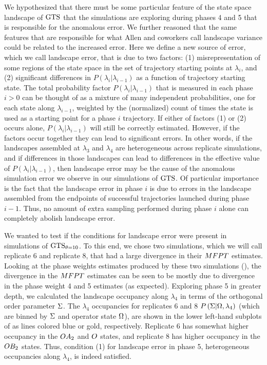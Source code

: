 We hypothesized that there must be some particular feature of the state space landscape of $\text{GTS}$ that the simulations are exploring during phases 4 and 5 that is responsible for the anomalous error. We further reasoned that the same features that are responsible for what Allen and coworkers call landscape variance\supercite{Allen:2006ch} could be related to the increased error. Here we define a new source of error, which we call landscape error, that is due to two factors: (1) misrepresentation of some regions of the state space in the set of trajectory starting points at $\lambda_i$, and (2) significant differences in $P\left(\lambda_{i}|\lambda_{i-1}\right)$ as a function of trajectory starting state. The total probability factor $P\left(\lambda_{i}|\lambda_{i-1}\right)$ that is measured in each phase $i>0$ can be thought of as a mixture of many independent probabilities, one for each state along $\lambda_{i-1}$, weighted by the (normalized) count of times the state is used as a starting point for a phase $i$ trajectory. If either of factors (1) or (2) occurs alone, $P\left(\lambda_{i}|\lambda_{i-1}\right)$ will still be correctly estimated. However, if the factors occur together they can lead to significant errors. In other words, if the landscapes assembled at $\lambda_3$ and $\lambda_4$ are heterogeneous across replicate simulations, and if differences in those landscapes can lead to differences in the effective value of $P\left(\lambda_{i}|\lambda_{i-1}\right)$, then landscape error may be the cause of the anomalous simulation error we observe in our simulations of $\text{GTS}$. Of particular importance is the fact that the landscape error in phase $i$ is due to errors in the landscape assembled from the endpoints of successful trajectories launched during phase $i-1$. Thus, no amount of extra sampling performed during phase $i$ alone can completely abolish landscape error.

We wanted to test if the conditions for landscape error were present in  simulations of $\text{GTS}_{\theta=10}$. To this end, we chose two simulations, which we will call replicate 6 and replicate 8, that had a large divergence in their $MFPT$ estimates. Looking at the phase weights estimates produced by these two simulations (), the divergence in the $MFPT$ estimates can be seen to be mostly due to divergence in the phase weight 4 and 5 estimates (as expected). Exploring phase 5 in greater depth, we calculated the landscape occupancy along $\lambda_4$ in terms of the orthogonal order parameter $\Sigma$. The $\lambda_4$ occupancies for replicates 6 and 8 $P\left(\Sigma | \Omega, \lambda_4\right)$ (which are binned by $\Sigma$ and operator state $\Omega$), are shown in the lower left-hand subplots of  as lines colored blue or gold, respectively. Replicate 6 has somewhat higher occupancy in the $OA_2$ and $O$ states, and replicate 8 has higher occupancy in the $OB_2$ states. Thus, condition (1) for landscape error in phase 5, heterogeneous occupancies along $\lambda_4$, is indeed satisfied.

